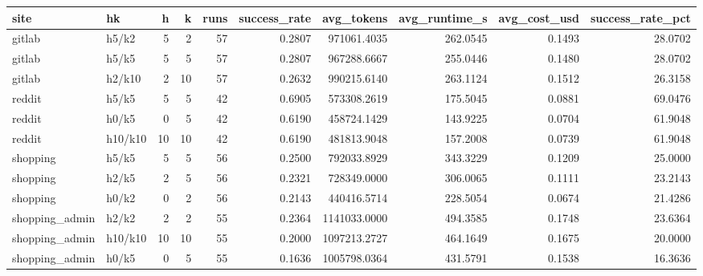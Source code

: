 \begin{tabular}{llrrrrrrrr}
\toprule
site & hk & h & k & runs & success_rate & avg_tokens & avg_runtime_s & avg_cost_usd & success_rate_pct \\
\midrule
gitlab & h5/k2 & 5 & 2 & 57 & 0.2807 & 971061.4035 & 262.0545 & 0.1493 & 28.0702 \\
gitlab & h5/k5 & 5 & 5 & 57 & 0.2807 & 967288.6667 & 255.0446 & 0.1480 & 28.0702 \\
gitlab & h2/k10 & 2 & 10 & 57 & 0.2632 & 990215.6140 & 263.1124 & 0.1512 & 26.3158 \\
reddit & h5/k5 & 5 & 5 & 42 & 0.6905 & 573308.2619 & 175.5045 & 0.0881 & 69.0476 \\
reddit & h0/k5 & 0 & 5 & 42 & 0.6190 & 458724.1429 & 143.9225 & 0.0704 & 61.9048 \\
reddit & h10/k10 & 10 & 10 & 42 & 0.6190 & 481813.9048 & 157.2008 & 0.0739 & 61.9048 \\
shopping & h5/k5 & 5 & 5 & 56 & 0.2500 & 792033.8929 & 343.3229 & 0.1209 & 25.0000 \\
shopping & h2/k5 & 2 & 5 & 56 & 0.2321 & 728349.0000 & 306.0065 & 0.1111 & 23.2143 \\
shopping & h0/k2 & 0 & 2 & 56 & 0.2143 & 440416.5714 & 228.5054 & 0.0674 & 21.4286 \\
shopping_admin & h2/k2 & 2 & 2 & 55 & 0.2364 & 1141033.0000 & 494.3585 & 0.1748 & 23.6364 \\
shopping_admin & h10/k10 & 10 & 10 & 55 & 0.2000 & 1097213.2727 & 464.1649 & 0.1675 & 20.0000 \\
shopping_admin & h0/k5 & 0 & 5 & 55 & 0.1636 & 1005798.0364 & 431.5791 & 0.1538 & 16.3636 \\
\bottomrule
\end{tabular}
